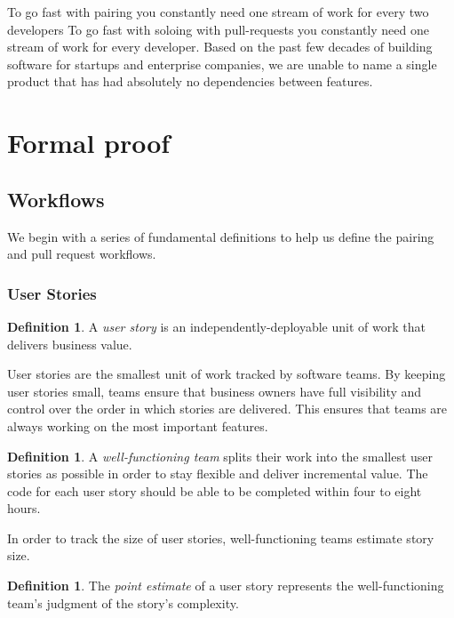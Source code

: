 \documentclass[letterpaper]{article}
\theoremstyle{definition}
\newtheorem{definition}[theorem]{Definition}
\begin{document}
    To go fast with pairing you constantly need one stream of work for every two developers
    To go fast with soloing with pull-requests you constantly need one stream of work for every developer.
    Based on the past few decades of building software for startups and enterprise companies, we are unable to name a
    single product that has had absolutely no dependencies between features.


    \section{Formal proof}\label{sec:formal-proof}

    \subsection{Workflows}\label{subsec:workflows}

    We begin with a series of fundamental definitions to help us define the pairing and pull request workflows.

    \subsubsection{User Stories}\label{subsubsec:user-stories}

    \begin{definition}
        A \textit{user story} is an independently-deployable unit of work that delivers business value.
    \end{definition}

    User stories are the smallest unit of work tracked by software teams.
    By keeping user stories small, teams ensure that business owners have full visibility and control over the order
    in which stories are delivered.
    This ensures that teams are always working on the most important features.

    \begin{definition}
        A \textit{well-functioning team} splits their work into the smallest user stories as possible in order to stay
        flexible and deliver incremental value.
        The code for each user story should be able to be completed within four to eight hours.
    \end{definition}

    In order to track the size of user stories, well-functioning teams estimate story size.

    \begin{definition}
        The \textit{point estimate} of a user story represents the well-functioning team's judgment of the story's
        complexity.
    \end{definition}
\end{document}
